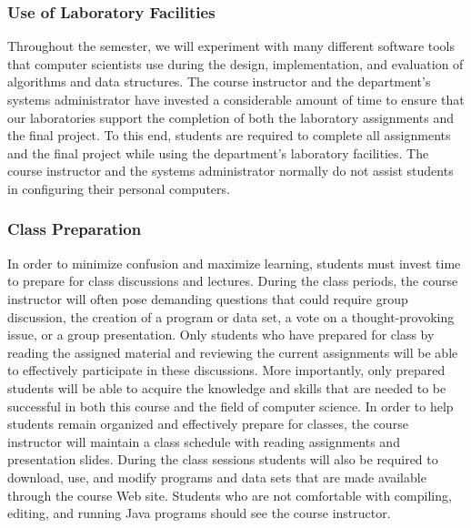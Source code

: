 \subsubsection*{Use of Laboratory Facilities}

Throughout the semester, we will experiment with many different software tools that computer scientists use during the
design, implementation, and evaluation of algorithms and data structures.  The course instructor and the department's
systems administrator have invested a considerable amount of time to ensure that our laboratories support the completion
of both the laboratory assignments and the final project.  To this end, students are required to complete all
assignments and the final project while using the department's laboratory facilities. The course instructor and the
systems administrator normally do not assist students in configuring their personal computers.

\subsubsection*{Class Preparation}

% 

In order to minimize confusion and maximize learning, students must invest time to prepare for class discussions and
lectures.  During the class periods, the course instructor will often pose demanding questions that could require group
discussion, the creation of a program or data set, a vote on a thought-provoking issue, or a group presentation.  Only
students who have prepared for class by reading the assigned material and reviewing the current assignments will be able
to effectively participate in these discussions.  More importantly, only prepared students will be able to acquire the
knowledge and skills that are needed to be successful in both this course and the field of computer science.  In order
to help students remain organized and effectively prepare for classes, the course instructor will maintain a class
schedule with reading assignments and presentation slides.   During the class sessions students will also be required to
download, use, and modify programs and data sets that are made available through the course Web site.  Students who are
not comfortable with compiling, editing, and running Java programs should see the course instructor.

